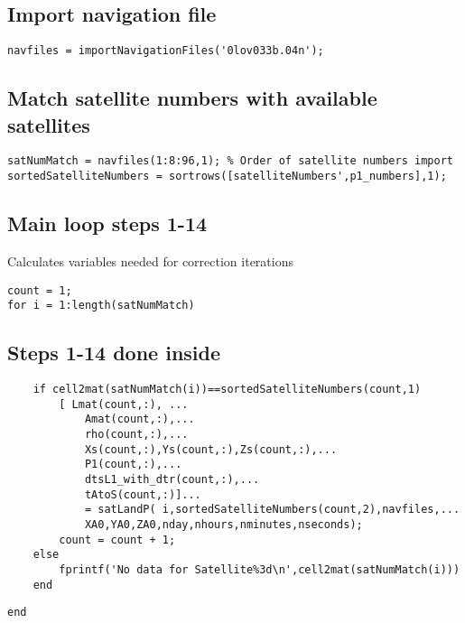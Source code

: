 \subsection*{Import navigation file}

\begin{verbatim}
navfiles = importNavigationFiles('0lov033b.04n');
\end{verbatim}


\subsection*{Match satellite numbers with available satellites}

\begin{verbatim}
satNumMatch = navfiles(1:8:96,1); % Order of satellite numbers import
sortedSatelliteNumbers = sortrows([satelliteNumbers',p1_numbers],1);
\end{verbatim}


\subsection*{Main loop steps 1-14}

\begin{par}
Calculates variables needed for correction iterations
\end{par} \vspace{1em}
\begin{verbatim}
count = 1;
for i = 1:length(satNumMatch)
\end{verbatim}


\subsection*{Steps 1-14 done inside}

\begin{verbatim}
    if cell2mat(satNumMatch(i))==sortedSatelliteNumbers(count,1)
        [ Lmat(count,:), ...
            Amat(count,:),...
            rho(count,:),...
            Xs(count,:),Ys(count,:),Zs(count,:),...
            P1(count,:),...
            dtsL1_with_dtr(count,:),...
            tAtoS(count,:)]...
            = satLandP( i,sortedSatelliteNumbers(count,2),navfiles,...
			XA0,YA0,ZA0,nday,nhours,nminutes,nseconds);
        count = count + 1;
    else
        fprintf('No data for Satellite%3d\n',cell2mat(satNumMatch(i)))
    end
\end{verbatim}
\color{black}
    \begin{verbatim}
end
\end{verbatim}


